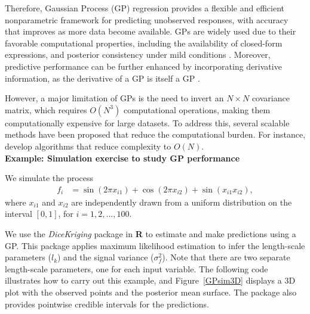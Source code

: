 Therefore, Gaussian Process (GP) regression provides a flexible and efficient nonparametric framework for predicting unobserved responses, with accuracy that improves as more data become available. GPs are widely used due to their favorable computational properties, including the availability of closed-form expressions, and posterior consistency under mild conditions \cite{choi2007posterior, stuart2018posterior}. Moreover, predictive performance can be further enhanced by incorporating derivative information, as the derivative of a GP is itself a GP \cite{solak2003derivative,jacobi2024posterior}. 

However, a major limitation of GPs is the need to invert an \( N \times N \) covariance matrix, which requires \( O(N^3) \) computational operations, making them computationally expensive for large datasets. To address this, several scalable methods have been proposed that reduce the computational burden. For instance, \cite{wilson2015kernel,gardner2018product, pleiss2018constant} develop algorithms that reduce complexity to \( O(N) \).\\

\textbf{Example: Simulation exercise to study GP performance}

We simulate the process
\begin{align*}
	f_i & = \sin(2\pi x_{i1}) + \cos(2\pi x_{i2}) + \sin(x_{i1} x_{i2}),
\end{align*}
where $x_{i1}$ and $x_{i2}$ are independently drawn from a uniform distribution on the interval $[0, 1]$, for $i = 1, 2, \dots, 100$.

We use the \textit{DiceKriging} package in \textbf{R} to estimate and make predictions using a GP. This package applies maximum likelihood estimation to infer the length-scale parameters ($l_k$) and the signal variance ($\sigma_f^2$). Note that there are two separate length-scale parameters, one for each input variable. The following code illustrates how to carry out this example, and Figure~\ref{GPsim3D} displays a 3D plot with the observed points and the posterior mean surface. The package also provides pointwise credible intervals for the predictions.

